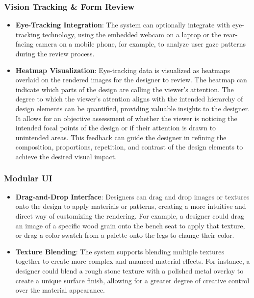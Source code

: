 \documentclass{article}
\begin{document}
\subsubsection{Vision Tracking \& Form Review}
\begin{itemize}
\item \textbf{Eye-Tracking Integration}: The system can optionally integrate with eye-tracking technology, using the embedded webcam on a laptop or the rear-facing camera on a mobile phone, for example, to analyze user gaze patterns during the review process.
\item \textbf{Heatmap Visualization}: Eye-tracking data is visualized as heatmaps overlaid on the rendered images for the designer to review. The heatmap can indicate which parts of the design are calling the viewer's attention. The degree to which the viewer's attention aligns with the intended hierarchy of design elements can be quantified, providing valuable insights to the designer. It allows for an objective assessment of whether the viewer is noticing the intended focal points of the design or if their attention is drawn to unintended areas. This feedback can guide the designer in refining the composition, proportions, repetition, and contrast of the design elements to achieve the desired visual impact.
\end{itemize}

\subsubsection{Modular UI}
\begin{itemize}
\item \textbf{Drag-and-Drop Interface}: Designers can drag and drop images or textures onto the design to apply materials or patterns, creating a more intuitive and direct way of customizing the rendering. For example, a designer could drag an image of a specific wood grain onto the bench seat to apply that texture, or drag a color swatch from a palette onto the legs to change their color.
\item \textbf{Texture Blending}: The system supports blending multiple textures together to create more complex and nuanced material effects. For instance, a designer could blend a rough stone texture with a polished metal overlay to create a unique surface finish, allowing for a greater degree of creative control over the material appearance.
\end{itemize}
\end{document}
